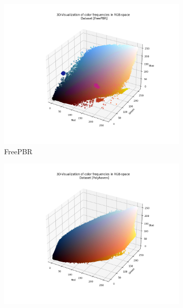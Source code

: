     \begin{figure}[h]
        \centering
        
        \begin{subfigure}{.33\textwidth}
          \centering
          \includegraphics[width=\linewidth]{../code/dataAnalysis/output/FreePBR.png}
          \caption{FreePBR}
          \label{fig:dataset-FreePBR}
        \end{subfigure}%
        \hfill
        \begin{subfigure}{.33\textwidth}
          \centering
          \includegraphics[width=\linewidth]{../code/dataAnalysis/output/Polyhaven.png}

\end{subfigure}
\end{figure}
